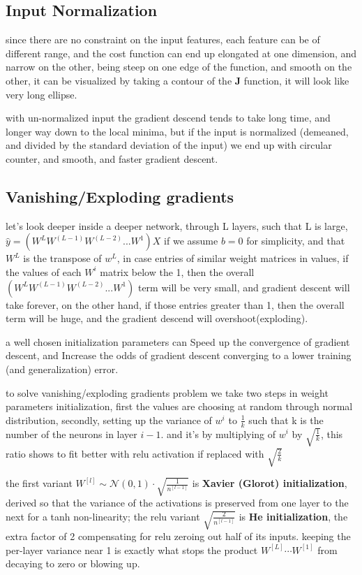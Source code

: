 \documentclass[4apaper,12pt]{book}
\begin{document}
\begin{description}
  \subsection{Input Normalization}
\item since there are no constraint on the input features, each feature can be of different range, and the cost function can end up elongated at one dimension, and narrow on the other, being steep on one edge of the function, and smooth on the other, it can be visualized by taking a contour of the \textbf{J} function, it will look like very long ellipse.
\item with un-normalized input the gradient descend tends to take long time, and longer way down to the local minima, but if the input is normalized (demeaned, and divided by the standard deviation of the input) we end up with circular counter, and smooth, and faster gradient descent.

\subsection{Vanishing/Exploding gradients}
\item let's look deeper inside a deeper network, through L layers, such that L is large, $\hat{y}=(W^LW^{(L-1)}W^{(L-2)}...W^1)X$ if we assume $b=0$ for simplicity, and that $W^L$ is the transpose of $w^L$, in case entries of similar weight matrices in values, if the values of each $W^i$ matrix below the 1, then the overall $(W^LW^{(L-1)}W^{(L-2)}...W^1)$ term will be very small, and gradient descent will take forever, on the other hand, if those entries greater than 1, then the overall term will be huge, and the gradient descend will overshoot(exploding).

\item a well chosen initialization parameters can Speed up the convergence of gradient descent, and Increase the odds of gradient descent converging to a lower training (and generalization) error.

\item to solve vanishing/exploding gradients problem we take two steps in weight parameters initialization, first the values are choosing at random through normal distribution, secondly, setting up the variance of $w^i$ to $\frac{1}{k}$  such that k is the number of the neurons in layer $i-1$. and it's by multiplying of $w^i$ by $\sqrt{\frac{1}{k}}$, this ratio shows to fit better with relu activation if replaced with $\sqrt{\frac{2}{k}}$
\item the first variant $W^{[l]}\sim\mathcal{N}(0,1)\cdot\sqrt{\frac{1}{n^{[l-1]}}}$ is \textbf{Xavier (Glorot) initialization}, derived so that the variance of the activations is preserved from one layer to the next for a tanh non-linearity; the relu variant $\sqrt{\frac{2}{n^{[l-1]}}}$ is \textbf{He initialization}, the extra factor of 2 compensating for relu zeroing out half of its inputs. keeping the per-layer variance near 1 is exactly what stops the product $W^{[L]}\cdots W^{[1]}$ from decaying to zero or blowing up.


\end{description}
\end{document}
